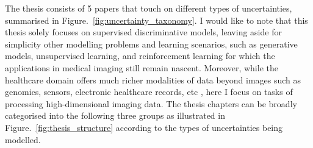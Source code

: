 The thesis consists of 5 papers that touch on different types of uncertainties, summarised in Figure.~\ref{fig:uncertainty_taxonomy}. I would like to note that this thesis solely focuses on supervised discriminative models, leaving aside for simplicity other modelling problems and learning scenarios, such as generative models, unsupervised learning, and reinforcement learning for which the applications in medical imaging still remain nascent. Moreover, while the healthcare domain offers much richer modalities of data beyond images such as genomics, sensors, electronic healthcare records, etc \cite{esteva2019guide}, here I focus on tasks of processing high-dimensional imaging data. The thesis chapters can be broadly categorised into the following three groups as illustrated in Figure.~\ref{fig:thesis_structure} according to the types of uncertainties being modelled. 

%
%

